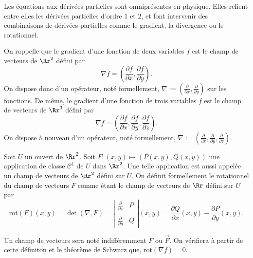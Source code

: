 \documentclass[12pt, class=report,crop=false]{standalone}
\begin{document}
\vskip4mm

\noindent Les équations aux dérivées partielles sont omniprésentes en physique. Elles relient entre elles les dérivées partielles d'ordre $1$ et $2$, et font intervenir des combinaisons de dérivées partielles comme le gradient, la divergence ou le rotationnel.

\vskip6mm

\noindent On rappelle que le gradient d'une fonction de deux variables $f$ est le champ de vecteurs de $\Rr^2$ défini par
$$\nabla f=\left(\frac{\partial f}{\partial x},\frac{\partial f}{\partial y}\right).$$
On dispose donc d'un opérateur, noté formellement, $\displaystyle \nabla :=\left(\frac{\partial }{\partial x},\frac{\partial }{\partial y}\right)$ sur les fonctions. De m\^eme, le gradient d'une fonction de trois variables $f$ est le champ de vecteurs de $\Rr^3$ défini par
$$\nabla f=\left(\frac{\partial f}{\partial x},\frac{\partial f}{\partial y},\frac{\partial f}{\partial z}\right).$$
On dispose à nouveau d'un opérateur, noté formellement, $\displaystyle \nabla :=\left(\frac{\partial }{\partial x},\frac{\partial }{\partial y},\frac{\partial }{\partial z}\right)$.

\vskip6mm

\begin{definition}Soit $U$ un ouvert de $\Rr^2$. Soit $F:(x,y)\mapsto \left(P(x,y),Q(x,y)\right)$ une application de classe $\mathscr{C}^1$ de $U$ dans $\Rr^2$. Une telle application est aussi appelée un champ de vecteurs de $\Rr^2$ défini sur $U$. On définit formellement le rotationnel du champ de vecteurs $F$ comme étant le champ de vecteurs de $\Rr$ défini sur $U$ par
$$\mathrm{rot}(F)(x,y)=\det (\nabla ,F)=\left|\begin{array}{cc}\frac{\partial}{\partial x}&P\\ \\ \frac{\partial}{\partial y}&Q
\end{array}\right|(x,y)=\frac{\partial Q}{\partial x}(x,y)-\frac{\partial P}{\partial y}(x,y).$$
\end{definition}

\vskip4mm

\noindent Un champ de vecteurs sera noté indifféremment $F$ ou $\overrightarrow{F}$. On vérifiera à partir de cette définiton et le théorème de Schwarz que, $\mbox{rot}(\nabla f)=0$.

\vskip6mm
\end{document}
